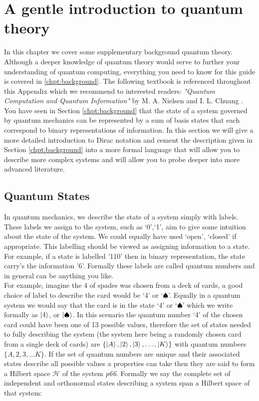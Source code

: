 \chapter{A gentle introduction to quantum theory}
\label{chpt:advancedtopics}

In this chapter we cover some supplementary background quantum theory. Although a deeper knowledge of quantum theory would serve to further your understanding of quantum computing, everything you need to know for this guide is covered in \autoref{chpt:background}. The following textbook is referenced throughout this Appendix which we recommend to interested readers: \textit{"Quantum Computation and Quantum Information"} by M. A. Nielsen and I. L. Chuang \cite{nielsen_chuang_2010}. You have seen in Section \autoref{chpt:background} that the state of a system governed by quantum mechanics can be represented by a sum of basis states that each correspond to binary representations of information. In this section we will give a more detailed introduction to Dirac notation and cement the description given in Section \autoref{chpt:background} into a more formal language that will allow you to describe more complex systems and will allow you to probe deeper into more advanced literature.


\section{Quantum States}

In quantum mechanics, we describe the state of a system simply with labels. These labels we assign to the system, such as {`0',`1'}, aim to give some intuition about the state of the system. We could equally have used {`open', `closed'} if appropriate. This labelling should be viewed as assigning information to a state. For example, if a state is labelled '110' then in binary representation, the state carry's the information '6'. Formally these labels are called quantum numbers and in general can be anything you like.\\

For example, imagine the 4 of spades was chosen from a deck of cards, a good choice of label to describe the card would be `4' or `$\spadesuit$'. Equally in a quantum system we would say that the card is in the state `4' or `$\spadesuit$' which we write formally as $\left\vert{4}\right\rangle$, or $\left\vert{\spadesuit}\right\rangle$. In this scenario the quantum number `4' of the chosen card could have been one of 13 possible values, therefore the set of states needed to fully describing the system (the system here being a randomly chosen card from a single deck of cards) are $\{\left\vert{A}\right\rangle, \left\vert{2}\right\rangle, \left\vert{3}\right\rangle,\ldots ,\left\vert{K}\right\rangle\}$ with quantum numbers $\{A,2,3,\ldots K\}$. If the set of quantum numbers are unique and their associated states describe all possible values a properties can take then they are said to form a Hilbert space $\mathcal{H}$ of the system \cite{nielsen_chuang_2010} \textit{p66}. Formally we say the complete set of independent and orthonormal states describing a system span a Hilbert space of that system:

